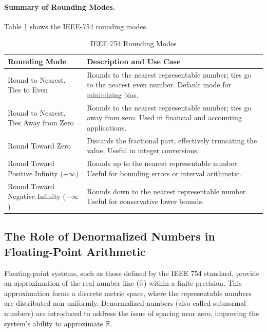 \paragraph{Summary of Rounding Modes.}
Table \ref{tab:rounding_modes} shows the IEEE-754 rounding modes.
\begin{table}[h!]
\centering
\renewcommand{\arraystretch}{1.3} %
\setlength{\tabcolsep}{6pt} %
\caption{IEEE 754 Rounding Modes}
\label{tab:rounding_modes}
\begin{tabular}{|p{4cm}|p{8cm}|}
\hline
\textbf{Rounding Mode}                 & \textbf{Description and Use Case}                                                                                     \\ \hline
Round to Nearest, Ties to Even         & Rounds to the nearest representable number; ties go to the nearest even number. Default mode for minimizing bias.     \\ \hline
Round to Nearest, Ties Away from Zero  & Rounds to the nearest representable number; ties go away from zero. Used in financial and accounting applications.     \\ \hline
Round Toward Zero                      & Discards the fractional part, effectively truncating the value. Useful in integer conversions.                         \\ \hline
Round Toward Positive Infinity (\(+\infty\)) & Rounds up to the nearest representable number. Useful for bounding errors or interval arithmetic.                     \\ \hline
Round Toward Negative Infinity (\(-\infty\)) & Rounds down to the nearest representable number. Useful for conservative lower bounds.                                 \\ \hline
\end{tabular}
\end{table}



\subsection{The Role of Denormalized Numbers in Floating-Point Arithmetic}

Floating-point systems, such as those defined by the IEEE 754 standard, provide an approximation of the real number line (\( \mathbb{R} \)) within a finite precision. This approximation forms a discrete metric space, where the representable numbers are distributed non-uniformly. Denormalized numbers (also called subnormal numbers) are introduced to address the issue of spacing near zero, improving the system's ability to approximate \( \mathbb{R} \).

